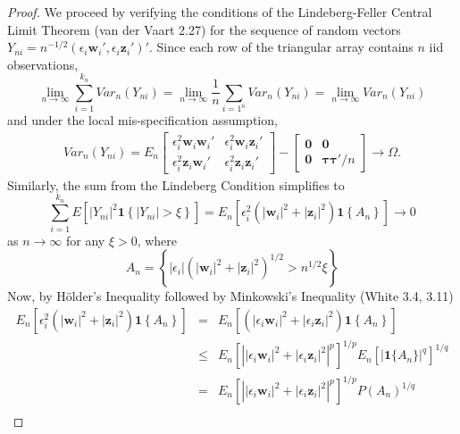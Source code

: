 \documentclass[12pt]{article}\usepackage[]{graphicx}\usepackage[]{color}
\theoremstyle{definition}
\begin{document}
\begin{proof}
We proceed by verifying the conditions of the Lindeberg-Feller Central Limit Theorem (van der Vaart 2.27) for the sequence of random vectors $Y_{ni} = n^{-1/2}\left(\epsilon_i \mathbf{w}_i', \epsilon_i \mathbf{z}_i' \right)'$. Since each row of the triangular array contains $n$ iid observations, 
  $$\lim_{n\rightarrow \infty}\sum_{i=1}^{k_n} Var_n(Y_{ni}) = \lim_{n\rightarrow \infty} \frac{1}{n} \sum_{i=1^n} Var_n(Y_{ni})= \lim_{n\rightarrow \infty} Var_n(Y_{ni})$$
and under the local mis-specification assumption,
  \begin{eqnarray*}
  Var_n(Y_{ni}) = E_n \left[\begin{array}{cc}
    \epsilon_i^2 \mathbf{w}_i \mathbf{w}_i' &  \epsilon_i^2 \mathbf{w}_i\mathbf{z}_i '\\
    \epsilon_i^2 \mathbf{z}_i \mathbf{w}_i'& \epsilon_i^2 \mathbf{z}_i \mathbf{z}_i'
    \end{array}\right] - \left[\begin{array}{cc}
    \mathbf{0} &  \mathbf{0}\\
    \mathbf{0}& \boldsymbol{\tau}\boldsymbol{\tau}'/n
    \end{array}\right] \rightarrow \Omega.
  \end{eqnarray*}
Similarly, the sum from the Lindeberg Condition simplifies to 
  $$\sum_{i=1}^{k_n} E\left[ \left|Y_{ni} \right|^2 \mathbf{1}\left\{\left|Y_{ni} \right| >\xi \right\}\right]= E_n \left[\epsilon_i^2 \left(\left|\mathbf{w}_i \right|^2 + \left| \mathbf{z}_i\right|^2 \right) \mathbf{1} \left\{A_n\right\}\right] \rightarrow 0$$
as $n \rightarrow \infty$ for any $\xi>0$, where
$$A_n = \left\{\left|\epsilon_i\right| \left( \left|\mathbf{w}_i \right|^2 + \left| \mathbf{z}_i\right|^2\right)^{1/2}  > n^{1/2}\xi\right\}$$ 
Now, by H\"{o}lder's Inequality followed by Minkowski's Inequality (White 3.4, 3.11)
  \begin{eqnarray*}
    E_n \left[\epsilon_i^2 \left(\left|\mathbf{w}_i \right|^2 + \left| \mathbf{z}_i\right|^2 \right) \mathbf{1} \left\{A_n\right\}\right] &=& E_n \left[\left(\left|\epsilon_i\mathbf{w}_i \right|^2 + \left|\epsilon_i \mathbf{z}_i\right|^2 \right) \mathbf{1} \left\{A_n\right\}\right]\\
    &\leq&E_n \left[\left|\left|\epsilon_i\mathbf{w}_i \right|^2 + \left|\epsilon_i \mathbf{z}_i\right|^2 \right|^p\right]^{1/p} E_n\left[\left|\mathbf{1}\{A_n\} \right|^q \right]^{1/q}\\
    &=& E_n \left[\left|\left|\epsilon_i\mathbf{w}_i \right|^2 + \left|\epsilon_i \mathbf{z}_i\right|^2 \right|^p\right]^{1/p} P(A_n)^{1/q}\\

\end{eqnarray*}
\end{proof}
\end{document}
